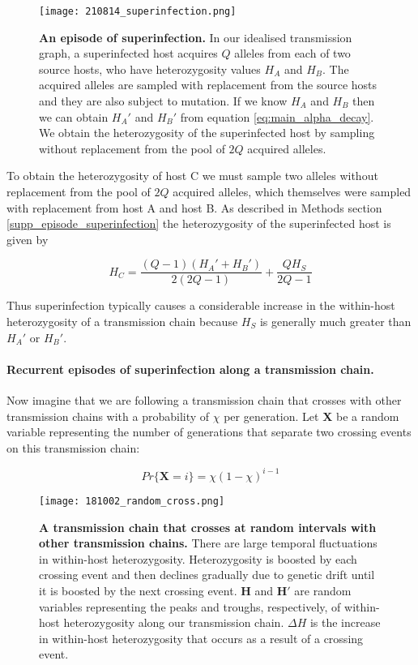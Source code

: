 \documentclass[_main.tex]{subfiles}
\begin{document}
\begin{figure}[h!]
\centering
\texttt{[image: 210814\_superinfection.png]}
\caption{\textbf{An episode of superinfection.}  In our idealised transmission graph, a superinfected host acquires $Q$ alleles from each of two source hosts, who have heterozygosity values $H_A$ and $H_B$.  The acquired alleles are sampled with replacement from the source hosts and they are also subject to mutation.  If we know $H_A$ and $H_B$ then we can obtain $H_A'$ and $H_B'$ from equation \ref{eq:main_alpha_decay}.  We obtain the heterozygosity of the superinfected host by sampling without replacement from the pool of $2Q$ acquired alleles.}
\label{fig:main_superinfected}
\end{figure}

To obtain the heterozygosity of host C we must sample two alleles without replacement from the pool of $2Q$ acquired alleles, which themselves were sampled with replacement from host A and host B.  As described in Methods section \ref{supp_episode_superinfection} the heterozygosity of the superinfected host is given by 

\begin{equation}
H_C =
\frac{(Q-1) (H_A' + H_B') }{2(2Q-1)} + \frac{Q H_S}{2Q-1}
\label{eq:crossing_tc_2}
\end{equation}

Thus superinfection typically causes a considerable increase in the within-host heterozygosity of a transmission chain because $H_S$ is generally much greater than $H_A'$ or $H_B'$.  

\paragraph{Recurrent episodes of superinfection along a transmission chain.}  

Now imagine that we are following a transmission chain that crosses with other transmission chains with a probability of $\chi$ per generation.  Let \textbf{X} be a random variable representing the number of generations that separate two crossing events on this transmission chain: 

\begin{equation}
Pr \{ \textbf{X} = i \} = \chi (1- \chi)^{i-1}
\label{eq:main_xprobdist}
\end{equation}

\begin{figure}[h!]
\centering
\texttt{[image: 181002\_random\_cross.png]}
\caption{
\textbf{A transmission chain that crosses at random intervals with other transmission chains.}  There are large temporal fluctuations in within-host heterozygosity.  Heterozygosity is boosted by each crossing event and then declines gradually due to genetic drift until it is boosted by the next crossing event.  $\mathbf{H}$ and  $\mathbf{H'}$ are random variables representing the peaks and troughs, respectively, of within-host heterozygosity along our transmission chain.   $\Delta H$ is the increase in within-host heterozygosity that occurs as a result of a crossing event.
}
\label{fig:tcrand}
\end{figure}
\end{document}

